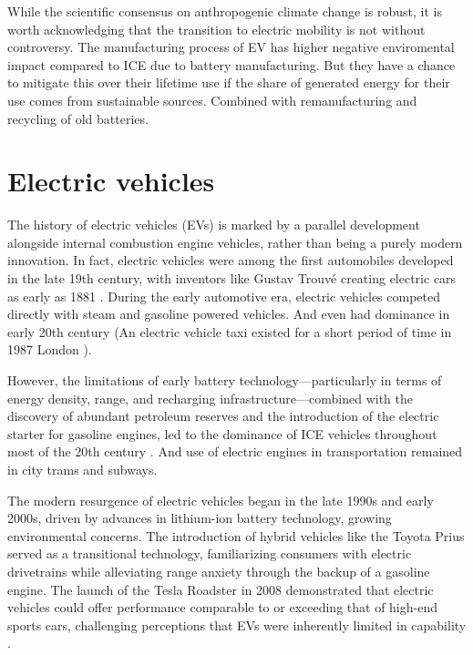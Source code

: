 While the scientific consensus on anthropogenic climate change is robust, it is worth acknowledging that the transition to electric mobility is not without controversy. The manufacturing process of \acrlong{EV} has higher negative enviromental impact compared to \acrlong{ICE} due to battery manufacturing. But they have a chance to mitigate this over their lifetime use if the share of generated energy for their use comes from sustainable sources. Combined with remanufacturing and recycling of old batteries. 

\section{Electric vehicles}

The history of electric vehicles (EVs) is marked by a parallel development alongside internal combustion engine vehicles, rather than being a purely modern innovation. In fact, electric vehicles were among the first automobiles developed in the late 19th century, with inventors like Gustav Trouvé creating electric cars as early as 1881 . During the early automotive era, electric vehicles competed directly with steam and gasoline powered vehicles. And even had dominance in early 20th century (An electric vehicle taxi existed for a short period of time in 1987 London ).

However, the limitations of early battery technology—particularly in terms of energy density, range, and recharging infrastructure—combined with the discovery of abundant petroleum reserves and the introduction of the electric starter for gasoline engines, led to the dominance of ICE vehicles throughout most of the 20th century . And use of electric engines in transportation remained in city trams and subways.

The modern resurgence of electric vehicles began in the late 1990s and early 2000s, driven by advances in lithium-ion battery technology, growing environmental concerns. The introduction of hybrid vehicles like the Toyota Prius served as a transitional technology, familiarizing consumers with electric drivetrains while alleviating range anxiety through the backup of a gasoline engine. The launch of the Tesla Roadster in 2008 demonstrated that electric vehicles could offer performance comparable to or exceeding that of high-end sports cars, challenging perceptions that EVs were inherently limited in capability .

